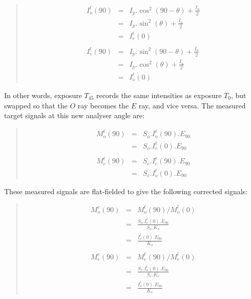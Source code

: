 \documentclass[twoside,11pt]{starlink}
\newenvironment{myquote}{\begin{quote}\begin{small}}{\end{small}\end{quote}}
\begin{document}
\begin{myquote}
\begin{eqnarray*}
  I^{t}_{o}(90) & = & I_{p}.\cos^{2}( 90 - \theta ) + \frac{I_{u}}{2} \\
                 & = & I_{p}.\sin^{2}( \theta ) + \frac{I_{u}}{2} \\
                 & = & I^{t}_{e}(0) \\ \\
  I^{t}_{e}(90) & = & I_{p}.\sin^{2}( 90 - \theta ) + \frac{I_{u}}{2} \\
                 & = & I_{p}.\cos^{2}( \theta ) + \frac{I_{u}}{2} \\
                 & = & I^{t}_{o}(0)
\end{eqnarray*}
\end{myquote}

In other words, exposure $T_{45}$ records the same intensities as
exposure $T_{0}$, but swapped so that the $O$ ray becomes the
$E$ ray, and vice versa. The measured target signals at this new
analyser angle are:

\begin{myquote}
\begin{eqnarray*}
  M^{t}_{o}(90) & = & S_{o}.I^{t}_{o}(90).E_{90} \\
                & = & S_{o}.I^{t}_{e}(0).E_{90} \\ \\
  M^{t}_{e}(90) & = & S_{e}.I^{t}_{e}(90).E_{90} \\
                & = & S_{e}.I^{t}_{o}(0).E_{90}
\end{eqnarray*}
\end{myquote}

These measured signals are flat-fielded to give the following corrected
signals:

\begin{myquote}
\begin{eqnarray*}
  M^{c}_{o}(90) & = & M^{t}_{o}(90) / M^{l}_{o}(0) \\
                & = & \frac{ S_{o}.I^{t}_{e}(0).E_{90} }{ S_{o}.K_{o} } \\
                & = & \frac{ I^{t}_{e}(0).E_{90} }{ K_{o} } \\ \\
  M^{c}_{e}(90) & = & M^{t}_{e}(90) / M^{l}_{e}(0) \\
                & = & \frac{ S_{e}.I^{t}_{o}(0).E_{90} }{ S_{e}.K_{e} } \\
                & = & \frac{ I^{t}_{o}(0).E_{90} }{ K_{e} }
\end{eqnarray*}
\end{myquote}
\end{document}
